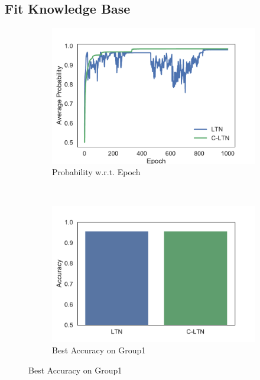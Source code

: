 \subsection{Fit Knowledge Base}

\begin{figure}[!]
    \centering
    \begin{subfigure}[]{0.33\textwidth}
        \includegraphics[width=\textwidth]{img/curve1.pdf}
        \caption{Probability w.r.t. Epoch}
        \label{fig:fitting-prob-epoch}
    \end{subfigure}~~~~
    \begin{subfigure}[]{0.33\textwidth}
        \includegraphics[width=\textwidth]{img/bar1.pdf}
        \caption{Best Accuracy on Group1}
        \label{fig:fitting-best-accuracy-1}

\end{subfigure}
\end{figure}

